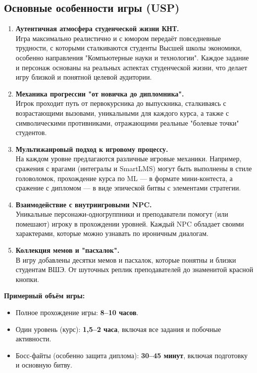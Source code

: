 \documentclass{article} %
\begin{document}
\subsection*{Основные особенности игры (USP)}

\begin{enumerate}
    \item \textbf{Аутентичная атмосфера студенческой жизни КНТ.} \\
    Игра максимально реалистично и с юмором передаёт повседневные трудности, с которыми сталкиваются студенты Высшей школы экономики, особенно направления "Компьютерные науки и технологии". Каждое задание и персонаж основаны на реальных аспектах студенческой жизни, что делает игру близкой и понятной целевой аудитории.

    \item \textbf{Механика прогрессии "от новичка до дипломника".} \\
    Игрок проходит путь от первокурсника до выпускника, сталкиваясь с возрастающими вызовами, уникальными для каждого курса, а также с символическими противниками, отражающими реальные "болевые точки" студентов.

    \item \textbf{Мультижанровый подход к игровому процессу.} \\
    На каждом уровне предлагаются различные игровые механики. Например, сражения с врагами (интегралы и SmartLMS) могут быть выполнены в стиле головоломок, прохождение курса по ML --- в формате мини-контеста, а сражение с дипломом --- в виде эпической битвы с элементами стратегии.

    \item \textbf{Взаимодействие с внутриигровыми NPC.} \\
    Уникальные персонажи-одногруппники и преподаватели помогут (или помешают) игроку в прохождении уровней. Каждый NPC обладает своими характерами, которые можно узнавать по ироничным диалогам.

    \item \textbf{Коллекция мемов и "пасхалок".} \\
    В игру добавлены десятки мемов и пасхалок, которые понятны и близки студентам ВШЭ. От шуточных реплик преподавателей до знаменитой красной кнопки.
\end{enumerate}

\textbf{Примерный объём игры:}

\begin{itemize}
    \item Полное прохождение игры: \textbf{8--10 часов}.
    \item Один уровень (курс): \textbf{1,5--2 часа}, включая все задания и побочные активности.
    \item Босс-файты (особенно защита диплома): \textbf{30--45 минут}, включая подготовку и основную битву.
\end{itemize}
\end{document}
